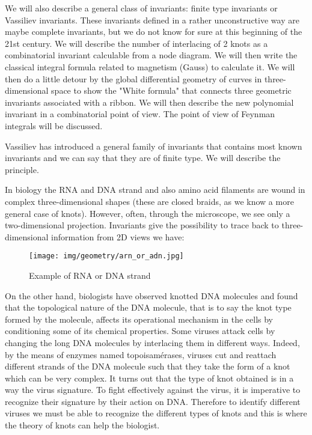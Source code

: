 {	We will also describe a general class of invariants: finite type invariants or Vassiliev invariants. These invariants defined in a rather unconstructive way are maybe complete invariants, but we do not know for sure at this beginning of the 21st century. We will describe the number of interlacing of 2 knots as a combinatorial invariant calculable from a node diagram. We will then write the classical integral formula related to magnetism (Gauss) to calculate it. We will then do a little detour by the global differential geometry of curves in three-dimensional space to show the "White formula" that connects three geometric invariants associated with a ribbon. We will then describe the new polynomial invariant in a combinatorial point of view. The point of view of Feynman integrals will be discussed.
	
	Vassiliev has introduced a general family of invariants that contains most known invariants and we can say that they are of finite type. We will describe the principle.
	
	In biology the RNA and DNA strand and also amino acid filaments are wound in complex three-dimensional shapes (these are closed braids, as we know a more general case of knots). However, often, through the microscope, we see only a two-dimensional projection. Invariants give the possibility to trace back to three-dimensional information from 2D views we have:
	
	\begin{figure}[H]
		\centering
		\texttt{[image: img/geometry/arn\_or\_adn.jpg]}
		\caption{Example of RNA or DNA strand}
	\end{figure}
	
	On the other hand, biologists have observed knotted DNA molecules and found that the topological nature of the DNA molecule, that is to say the knot type formed by the molecule, affects its operational mechanism in the cells by conditioning some of its chemical properties. Some viruses attack cells by changing the long DNA molecules by interlacing them in different ways. Indeed, by the means of enzymes named topoisamérases, viruses cut and reattach different strands of the DNA molecule such that they take the form of a knot which can be very complex. It turns out that the type of knot obtained is in a way the virus signature. To fight effectively against the virus, it is imperative to recognize their signature by their action on DNA. Therefore to identify different viruses we must be able to recognize the different types of knots and this is where the theory of knots can help the biologist.
	
}
